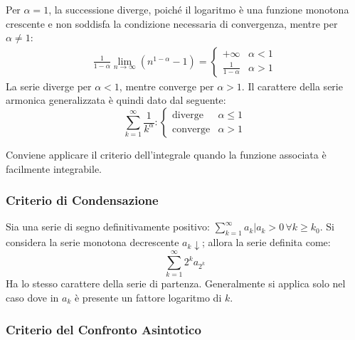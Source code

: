 \documentclass{article}
\numberwithin{equation}{subsection}
\begin{document}
Per $\alpha=1$, la successione diverge, poiché il logaritmo è una funzione monotona crescente e non soddisfa la condizione necessaria di convergenza, mentre per $\alpha\neq1$:
\begin{gather*}
    \displaystyle\frac{1}{1-\alpha}\lim_{n\to\infty}\left(n^{1-\alpha}-1\right)=\begin{cases}
        +\infty&\alpha<1\\
        \displaystyle\frac{1}{1-\alpha}&\alpha>1
    \end{cases}
\end{gather*}
La serie diverge per $\alpha<1$, mentre converge per $\alpha>1$. 
Il carattere della serie armonica generalizzata è quindi dato dal seguente:
\begin{equation}
    \displaystyle\sum_{k=1}^\infty\frac{1}{k^\alpha}:\begin{cases}
        \text{diverge}&\alpha\le1\\
        \text{converge}&\alpha>1        
    \end{cases}
\end{equation}


Conviene applicare il criterio dell'integrale quando la funzione associata è facilmente integrabile. 

\subsubsection{Criterio di Condensazione}

Sia una serie di segno definitivamente positivo: $\sum_{k=1}^\infty a_k | a_k>0\,\forall k\geq k_0$. Si considera la serie monotona decrescente $a_k\downarrow$; allora la serie definita come:
\begin{equation}
    \sum_{k=1}^{\infty} 2^ka_{2^k}   
\end{equation}
Ha lo stesso carattere della serie di partenza. Generalmente si applica solo nel caso dove in $a_k$ è presente un fattore logaritmo di $k$. 

\subsubsection{Criterio del Confronto Asintotico}
\end{document}
